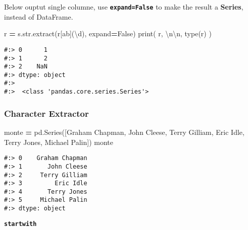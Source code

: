 \documentclass[
]{book}
\newenvironment{Shaded}{\begin{snugshade}}{\end{snugshade}}
\newcommand{\BuiltInTok}[1]{#1}
\newcommand{\CharTok}[1]{\textcolor[rgb]{0.5,0.5,0.5}{#1}}
\newcommand{\NormalTok}[1]{#1}
\newcommand{\OperatorTok}[1]{\textcolor[rgb]{0.43,0.43,0.43}{\textbf{#1}}}
\newcommand{\StringTok}[1]{\textcolor[rgb]{0.5,0.5,0.5}{#1}}
\newcommand{\VariableTok}[1]{\textcolor[rgb]{0,0,0}{#1}}
\newcommand{\VerbatimStringTok}[1]{\textcolor[rgb]{0.5,0.5,0.5}{#1}}
\begin{document}
Below ouptut single columne, use \textbf{\texttt{expand=False}} to make the result a \textbf{Series}, instead of DataFrame.

\begin{Shaded}
\begin{Highlighting}[]
\NormalTok{r }\OperatorTok{=}\NormalTok{ s.}\BuiltInTok{str}\NormalTok{.extract(}\VerbatimStringTok{r\textquotesingle{}[ab](\textbackslash{}d)\textquotesingle{}}\NormalTok{, expand}\OperatorTok{=}\VariableTok{False}\NormalTok{)}
\BuiltInTok{print}\NormalTok{( r, }\StringTok{\textquotesingle{}}\CharTok{\textbackslash{}n\textbackslash{}n}\StringTok{\textquotesingle{}}\NormalTok{, }\BuiltInTok{type}\NormalTok{(r) )}
\end{Highlighting}
\end{Shaded}

\begin{verbatim}
#:> 0      1
#:> 1      2
#:> 2    NaN
#:> dtype: object 
#:> 
#:>  <class 'pandas.core.series.Series'>
\end{verbatim}

\hypertarget{character-extractor}{%
\subsubsection{Character Extractor}\label{character-extractor}}

\begin{Shaded}
\begin{Highlighting}[]
\NormalTok{monte }\OperatorTok{=}\NormalTok{ pd.Series([}\StringTok{\textquotesingle{}Graham Chapman\textquotesingle{}}\NormalTok{, }\StringTok{\textquotesingle{}John Cleese\textquotesingle{}}\NormalTok{, }\StringTok{\textquotesingle{}Terry Gilliam\textquotesingle{}}\NormalTok{,}
                   \StringTok{\textquotesingle{}Eric Idle\textquotesingle{}}\NormalTok{, }\StringTok{\textquotesingle{}Terry Jones\textquotesingle{}}\NormalTok{, }\StringTok{\textquotesingle{}Michael Palin\textquotesingle{}}\NormalTok{])}
\NormalTok{monte}
\end{Highlighting}
\end{Shaded}

\begin{verbatim}
#:> 0    Graham Chapman
#:> 1       John Cleese
#:> 2     Terry Gilliam
#:> 3         Eric Idle
#:> 4       Terry Jones
#:> 5     Michael Palin
#:> dtype: object
\end{verbatim}

\textbf{\texttt{startwith}}
\end{document}
